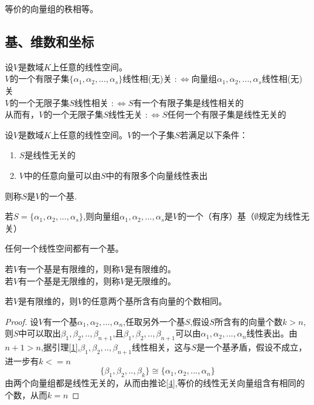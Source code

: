 \documentclass[blue,normal,cn]{elegantnote}
\begin{document}
\begin{corollary}
    \label{4}
等价的向量组的秩相等。
\end{corollary}


\subsection{基、维数和坐标}

\begin{definition}
    设$V$是数域$K$上任意的线性空间。\\
    $V$的一个有限子集$\{α_1,α_2,...,α_s\}$线性相(无)关
    $:\Leftrightarrow$向量组$α_1,α_2,...,α_s$线性相(无)关\\
    $V$的一个无限子集$S$线性相关
    $:\Leftrightarrow S$有一个有限子集是线性相关的\\
    从而有，$V$的一个无限子集$S$线性无关 $:\Leftrightarrow S$任何一个有限子集是线性无关的
\end{definition}

\begin{definition}
    设$V$是数域$K$上任意的线性空间。$V$的一个子集$S$若满足以下条件：
    \begin{enumerate}
        \item $S$是线性无关的
        \item $V$中的任意向量可以由$S$中的有限多个向量线性表出
    \end{enumerate}
    则称$S$是$V$的一个基.
\end{definition}

若$S=\{α_1,α_2,...,α_s\}$,则向量组$α_1,α_2,...,α_s$是$V$的一个（有序）基（$∅$规定为线性无关）

\begin{proposition}
任何一个线性空间都有一个基。
\end{proposition}

\begin{definition}
    若$V$有一个基是有限维的，则称$V$是有限维的。\\
    若$V$有一个基是无限维的，则称$V$是无限维的。
\end{definition}

\begin{theorem}
    \label{thr_2}
    若$V$是有限维的，则$V$的任意两个基所含有向量的个数相同。
\end{theorem}

\begin{proof}
    设$V$有一个基$ α_1,α_2,...,α_n$,任取另外一个基$S$,假设$S$所含有的向量个数$k>n$,则$S$中可以取出$β_1,β_2,..,β_{n+1}$,且$β_1,β_2,..,β_{n+1}$可以由$ α_1,α_2,...,α_n$线性表出。由$n+1>n$,据引理\ref{1},$β_1,β_2,..,β_{n+1}$线性相关，这与$S$是一个基矛盾，假设不成立，进一步有$k<=n$
    $$
        \{β_1,β_2,..,β_{k}\} \cong \{α_1,α_2,...,α_n\} 
    $$
    由两个向量组都是线性无关的，从而由推论\ref{4},等价的线性无关向量组含有相同的个数，从而$k=n$
\end{proof}
\end{document}
